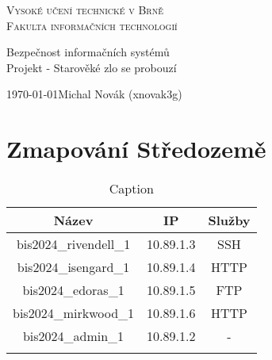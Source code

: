 \documentclass[a4paper, 11pt]{article}
\begin{document}
    \begin{titlepage}
        \begin{center}
            \Huge{\scshape{Vysoké učení technické v Brně}\\}
            \huge{\scshape Fakulta informačních technologií\\}

            \LARGE{Bezpečnost informačních systémů\\}
            \Huge{Projekt \-- Starověké zlo se probouzí}

        \end{center}
        
        \Large{\today \hfill Michal Novák (xnovak3g)}
    \end{titlepage}


\section{Zmapování Středozemě}

\begin{table}[!ht]
    \centering
    \begin{tabular}{|c|c|c|}
         \hline
         Název & IP & Služby \\ 
         \hline\hline
         bis2024\_rivendell\_1 & 10.89.1.3 & SSH \\ 
         \hline
         bis2024\_isengard\_1 & 10.89.1.4 & HTTP \\
         \hline
         bis2024\_edoras\_1 & 10.89.1.5 & FTP \\
         \hline
         bis2024\_mirkwood\_1 & 10.89.1.6 & HTTP \\
         \hline
         bis2024\_admin\_1 & 10.89.1.2 & - \\
         \hline
         &  &  \\
         \hline
         
    \end{tabular}
    \caption{Caption}
    \label{tab:my_label}
\end{table}
\end{document}

